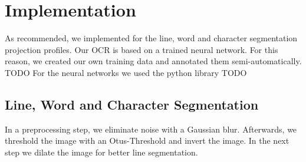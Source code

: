 \documentclass[english, paper=a4]{scrartcl}
\begin{document}
\section{Implementation}
As recommended, we implemented for the line, word and character segmentation projection profiles. 
Our OCR is based on a trained neural network. For this reason, we created our own training data and annotated them
semi-automatically. TODO
For the neural networks we used the python library TODO


\subsection{Line, Word and Character Segmentation}
In a preprocessing step, we eliminate noise with a Gaussian blur. Afterwards, we threshold the image with 
an Otus-Threshold and invert the image. In the next step we dilate the image for better line segmentation.
\end{document}
